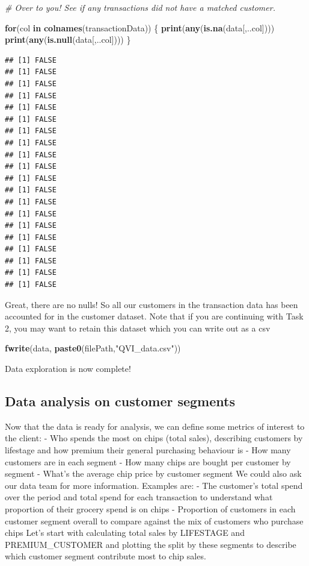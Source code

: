 \documentclass[
]{article}
\newenvironment{Shaded}{\begin{snugshade}}{\end{snugshade}}
\newcommand{\CommentTok}[1]{\textcolor[rgb]{0.56,0.35,0.01}{\textit{#1}}}
\newcommand{\ControlFlowTok}[1]{\textcolor[rgb]{0.13,0.29,0.53}{\textbf{#1}}}
\newcommand{\FunctionTok}[1]{\textcolor[rgb]{0.13,0.29,0.53}{\textbf{#1}}}
\newcommand{\NormalTok}[1]{#1}
\newcommand{\StringTok}[1]{\textcolor[rgb]{0.31,0.60,0.02}{#1}}
\begin{document}
\begin{Shaded}
\begin{Highlighting}[]
\CommentTok{\# Over to you! See if any transactions did not have a matched customer.}

\ControlFlowTok{for}\NormalTok{(col }\ControlFlowTok{in} \FunctionTok{colnames}\NormalTok{(transactionData))}
\NormalTok{\{}
  \FunctionTok{print}\NormalTok{(}\FunctionTok{any}\NormalTok{(}\FunctionTok{is.na}\NormalTok{(data[,..col])))}
  \FunctionTok{print}\NormalTok{(}\FunctionTok{any}\NormalTok{(}\FunctionTok{is.null}\NormalTok{(data[,..col])))}
\NormalTok{\}}
\end{Highlighting}
\end{Shaded}

\begin{verbatim}
## [1] FALSE
## [1] FALSE
## [1] FALSE
## [1] FALSE
## [1] FALSE
## [1] FALSE
## [1] FALSE
## [1] FALSE
## [1] FALSE
## [1] FALSE
## [1] FALSE
## [1] FALSE
## [1] FALSE
## [1] FALSE
## [1] FALSE
## [1] FALSE
## [1] FALSE
## [1] FALSE
## [1] FALSE
## [1] FALSE
\end{verbatim}

Great, there are no nulls! So all our customers in the transaction data
has been accounted for in the customer dataset. Note that if you are
continuing with Task 2, you may want to retain this dataset which you
can write out as a csv

\begin{Shaded}
\begin{Highlighting}[]
\FunctionTok{fwrite}\NormalTok{(data, }\FunctionTok{paste0}\NormalTok{(filePath,}\StringTok{"QVI\_data.csv"}\NormalTok{))}
\end{Highlighting}
\end{Shaded}

Data exploration is now complete!

\hypertarget{data-analysis-on-customer-segments}{%
\subsection{Data analysis on customer
segments}\label{data-analysis-on-customer-segments}}

Now that the data is ready for analysis, we can define some metrics of
interest to the client: - Who spends the most on chips (total sales),
describing customers by lifestage and how premium their general
purchasing behaviour is - How many customers are in each segment - How
many chips are bought per customer by segment - What's the average chip
price by customer segment We could also ask our data team for more
information. Examples are: - The customer's total spend over the period
and total spend for each transaction to understand what proportion of
their grocery spend is on chips - Proportion of customers in each
customer segment overall to compare against the mix of customers who
purchase chips Let's start with calculating total sales by LIFESTAGE and
PREMIUM\_CUSTOMER and plotting the split by these segments to describe
which customer segment contribute most to chip sales.
\end{document}
